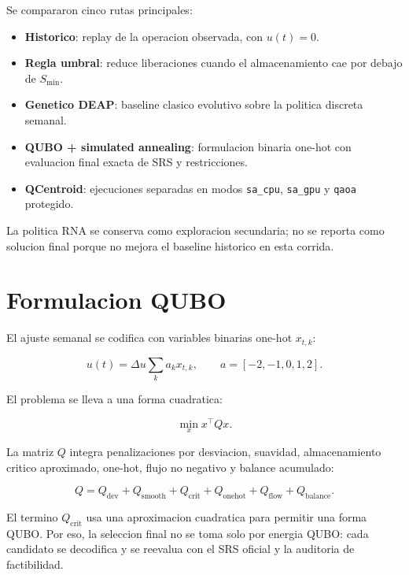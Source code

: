 \documentclass[11pt,letterpaper]{article}
\begin{document}
Se compararon cinco rutas principales:

\begin{itemize}
  \item \textbf{Historico}: replay de la operacion observada, con $u(t)=0$.
  \item \textbf{Regla umbral}: reduce liberaciones cuando el almacenamiento cae
  por debajo de $S_{\min}$.
  \item \textbf{Genetico DEAP}: baseline clasico evolutivo sobre la politica
  discreta semanal.
  \item \textbf{QUBO + simulated annealing}: formulacion binaria one-hot con
  evaluacion final exacta de SRS y restricciones.
  \item \textbf{QCentroid}: ejecuciones separadas en modos \texttt{sa\_cpu},
  \texttt{sa\_gpu} y \texttt{qaoa} protegido.
\end{itemize}

La politica RNA se conserva como exploracion secundaria; no se reporta como
solucion final porque no mejora el baseline historico en esta corrida.

\section{Formulacion QUBO}

El ajuste semanal se codifica con variables binarias one-hot $x_{t,k}$:

\begin{equation}
u(t) = \Delta u \sum_k a_k x_{t,k},
\qquad
a=[-2,-1,0,1,2].
\end{equation}

El problema se lleva a una forma cuadratica:

\begin{equation}
\min_x x^\top Qx.
\end{equation}

La matriz $Q$ integra penalizaciones por desviacion, suavidad, almacenamiento
critico aproximado, one-hot, flujo no negativo y balance acumulado:

\begin{equation}
Q =
Q_{\mathrm{dev}}+
Q_{\mathrm{smooth}}+
Q_{\mathrm{crit}}+
Q_{\mathrm{onehot}}+
Q_{\mathrm{flow}}+
Q_{\mathrm{balance}}.
\end{equation}

El termino $Q_{\mathrm{crit}}$ usa una aproximacion cuadratica para permitir
una forma QUBO. Por eso, la seleccion final no se toma solo por energia QUBO:
cada candidato se decodifica y se reevalua con el SRS oficial y la auditoria
de factibilidad.
\end{document}
